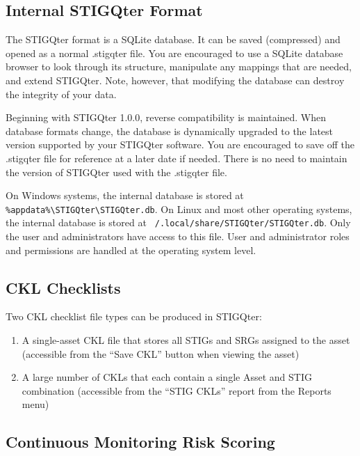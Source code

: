 \documentclass[letterpaper, 10pt, twoside]{article}
\begin{document}
\subsection{Internal STIGQter Format}

The STIGQter format is a SQLite database. It can be saved (compressed) and opened as a normal .stigqter file. You are encouraged to use a SQLite database browser to look through its structure, manipulate any mappings that are needed, and extend STIGQter. Note, however, that modifying the database can destroy the integrity of your data.

Beginning with STIGQter 1.0.0, reverse compatibility is maintained. When database formats change, the database is dynamically upgraded to the latest version supported by your STIGQter software. You are encouraged to save off the .stigqter file for reference at a later date if needed. There is no need to maintain the version of STIGQter used with the .stigqter file.

On Windows systems, the internal database is stored at \texttt{\%appdata\%\textbackslash\allowbreak STIGQter\textbackslash\allowbreak STIGQter.db}. On Linux and most other operating systems, the internal database is stored at \texttt{~/.local/\allowbreak share/\allowbreak STIGQter/\allowbreak STIGQter.db}. Only the user and administrators have access to this file. User and administrator roles and permissions are handled at the operating system level.

\subsection{CKL Checklists}

Two CKL checklist file types can be produced in STIGQter:

\begin{enumerate}
	\item A single-asset CKL file that stores all STIGs and SRGs assigned to the asset (accessible from the ``Save CKL'' button when viewing the asset)
	\item A large number of CKLs that each contain a single Asset and STIG combination (accessible from the ``STIG CKLs'' report from the Reports menu)
\end{enumerate}

\subsection{Continuous Monitoring Risk Scoring}
\end{document}

